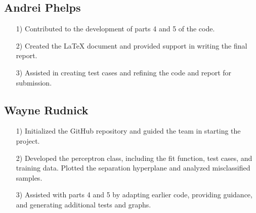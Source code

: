 \documentclass{article}
\begin{document}
\subsection{Andrei Phelps}
\begin{itemize}
    \item[1)] Contributed to the development of parts 4 and 5 of the code.
    \item[2)] Created the LaTeX document and provided support in writing the final report.
    \item[3)] Assisted in creating test cases and refining the code and report for submission.
\end{itemize}

\subsection{Wayne Rudnick}
\begin{itemize}
    \item[1)] Initialized the GitHub repository and guided the team in starting the project.
    \item[2)] Developed the perceptron class, including the fit function, test cases, and training data. Plotted the separation hyperplane and analyzed misclassified samples.
    \item[3)] Assisted with parts 4 and 5 by adapting earlier code, providing guidance, and generating additional tests and graphs.
\end{itemize}
\end{document}
